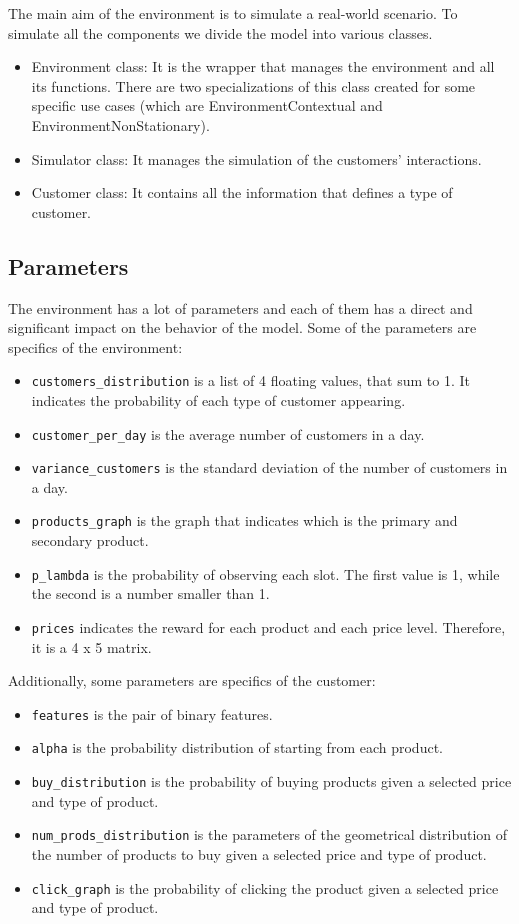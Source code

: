 The main aim of the environment is to simulate a real-world scenario. To simulate all the components we divide the model into various classes.
\begin{itemize}
    \item Environment class: It is the wrapper that manages the environment and all its functions. There are two specializations of this class created for some specific use cases (which are EnvironmentContextual and EnvironmentNonStationary).
    \item Simulator class: It manages the simulation of the customers' interactions.
    \item Customer class: It contains all the information that defines a type of customer.
\end{itemize}

\subsection{Parameters}
The environment has a lot of parameters and each of them has a direct and significant impact on the behavior of the model.
Some of the parameters are specifics of the environment:
\begin{itemize}
  \item \verb|customers_distribution| is a list of 4 floating values, that sum to 1. It indicates the probability of each type of customer appearing.
  \item \verb|customer_per_day| is the average number of customers in a day.
  \item \verb|variance_customers| is the standard deviation of the number of customers in a day.
  \item \verb|products_graph| is the graph that indicates which is the primary and secondary product.
  \item \verb|p_lambda| is the probability of observing each slot. The first value is 1, while the second is a number smaller than 1.
  \item \verb|prices| indicates the reward for each product and each price level. Therefore, it is a 4 x 5 matrix.
\end{itemize}
Additionally, some parameters are specifics of the customer:
\begin{itemize}
    \item \verb|features| is the pair of binary features.
    \item \verb|alpha| is the probability distribution of starting from each product.
    \item \verb|buy_distribution| is the probability of buying products given a selected price and type of product.
    \item \verb|num_prods_distribution| is the parameters of the geometrical distribution of the number of products to buy given a selected price and type of product.
    \item \verb|click_graph| is the probability of clicking the product given a selected price and type of product.
\end{itemize}

